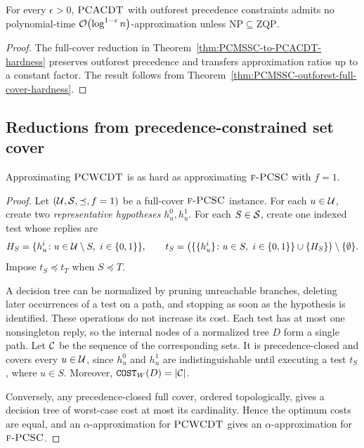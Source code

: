 \begin{corollary}\label{cor:PCACDT-outforest-hardness}
    For every $\epsilon>0$, $\textup{\textsc{PCACDT}}$ with outforest precedence constraints admits no polynomial-time $\mathcal{O}\mathopen{}\left( \log^{1-\epsilon} n \right)$-approximation unless $\mathrm{NP}\subseteq\mathrm{ZQP}$.
\end{corollary}
\begin{proof}
    The full-cover reduction in Theorem~\ref{thm:PCMSSC-to-PCACDT-hardness} preserves outforest precedence and transfers approximation ratios up to a constant factor. The result follows from Theorem~\ref{thm:PCMSSC-outforest-full-cover-hardness}.
\end{proof}

\subsection{Reductions from precedence-constrained set cover}
\begin{theorem}\label{thm:PCSC-to-PCWCDT-hardness}
    Approximating $\textup{\textsc{PCWCDT}}$ is as hard as approximating $\textup{\textsc{f-PCSC}}$ with $f=1$.
\end{theorem}
\begin{proof}
    Let $(\mathcal{U},\mathcal{S},\preceq,f=1)$ be a full-cover $\textup{\textsc{f-PCSC}}$ instance. For each $u\in\mathcal{U}$, create two \emph{representative hypotheses} $h_u^0,h_u^1$.
    For each $S\in\mathcal{S}$, create one indexed test whose replies are
    \[
        H_S=\{h_u^i\colon u\in\cU\setminus S,\ i\in\{0,1\}\},
        \qquad t_S=\bigl(\{\{h_u^i\}\colon u\in S,\ i\in\{0,1\}\}\cup\{H_S\}\bigr)\setminus\{\emptyset\}.
    \]
    Impose $t_S\preceq t_T$ when $S\preceq T$.

    A decision tree can be normalized by pruning unreachable branches, deleting later occurrences of a test on a path, and stopping as soon as the hypothesis is identified. These operations do not increase its cost. Each test has at most one nonsingleton reply, so the internal nodes of a normalized tree $D$ form a single path. Let $\mathcal{C}$ be the sequence of the corresponding sets. It is precedence-closed and covers every $u\in\mathcal{U}$, since $h_u^0$ and $h_u^1$ are indistinguishable until executing a test $t_S$, where $u\in S$. Moreover, $\texttt{COST}_W\mathopen{}\left( D \right)=\mathopen{}\left| \mathcal{C} \right|$.

    Conversely, any precedence-closed full cover, ordered topologically, gives a decision tree of worst-case cost at most its cardinality. Hence the optimum costs are equal, and an $\alpha$-approximation for $\textup{\textsc{PCWCDT}}$ gives an $\alpha$-approximation for $\textup{\textsc{f-PCSC}}$.
\end{proof}
